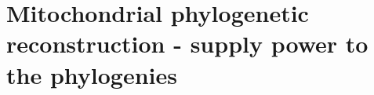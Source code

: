 \section[Mitochondrial phylogenetic reconstruction]{Mitochondrial phylogenetic reconstruction - supply power to the phylogenies}
\label{cascade-sec:mitochondria}